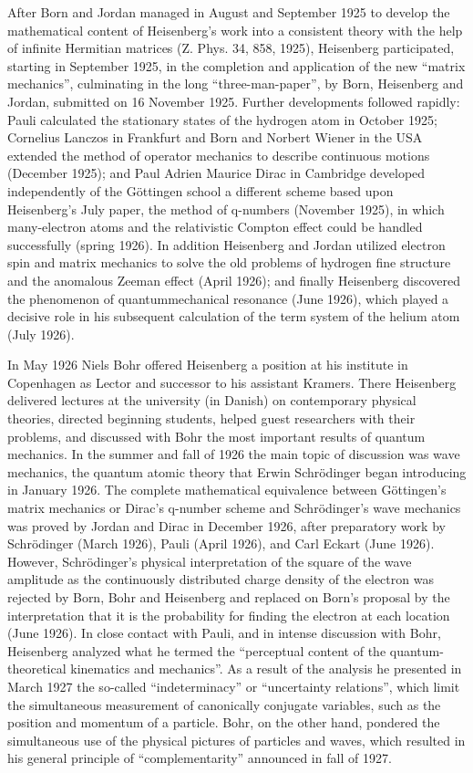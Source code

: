 \documentclass{article}
\begin{document}
After Born and Jordan managed in August and September 1925 to develop the mathematical content of Heisenberg's work into a consistent theory with the help of infinite Hermitian matrices (Z. Phys. 34, 858, 1925), Heisenberg participated, starting in September 1925, in the completion and application of the new “matrix mechanics”, culminating in the long “three-man-paper”, by Born, Heisenberg and Jordan, submitted on 16 November 1925. Further developments followed rapidly: Pauli calculated the stationary states of the hydrogen atom in October 1925; Cornelius Lanczos in Frankfurt and Born and Norbert Wiener in the USA extended the method of operator mechanics to describe continuous motions (December 1925); and Paul Adrien Maurice Dirac in Cambridge developed independently of the Göttingen school a different scheme based upon Heisenberg's July paper, the method of q-numbers (November 1925), in which many-electron atoms and the relativistic Compton effect could be handled successfully (spring 1926). In addition Heisenberg and Jordan utilized electron spin and matrix mechanics to solve the old problems of hydrogen fine structure and the anomalous Zeeman effect (April 1926); and finally Heisenberg discovered the phenomenon of quantummechanical resonance (June 1926), which played a decisive role in his subsequent calculation of the term system of the helium atom (July 1926).

In May 1926 Niels Bohr offered Heisenberg a position at his institute in Copenhagen as Lector and successor to his assistant Kramers. There Heisenberg delivered lectures at the university (in Danish) on contemporary physical theories, directed beginning students, helped guest researchers with their problems, and discussed with Bohr the most important results of quantum mechanics. In the summer and fall of 1926 the main topic of discussion was wave mechanics, the quantum atomic theory that Erwin Schrödinger began introducing in January 1926. The complete mathematical equivalence between Göttingen's matrix mechanics or Dirac's q-number scheme and Schrödinger's wave mechanics was proved by Jordan and Dirac in December 1926, after preparatory work by Schrödinger (March 1926), Pauli (April 1926), and Carl Eckart (June 1926). However, Schrödinger's physical interpretation of the square of the wave amplitude as the continuously distributed charge density of the electron was rejected by Born, Bohr and Heisenberg and replaced on Born's proposal by the interpretation that it is the probability for finding the electron at each location (June 1926). In close contact with Pauli, and in intense discussion with Bohr, Heisenberg analyzed what he termed the “perceptual content of the quantum-theoretical kinematics and mechanics”. As a result of the analysis he presented in March 1927 the so-called “indeterminacy” or “uncertainty relations”, which limit the simultaneous measurement of canonically conjugate variables, such as the position and momentum of a particle. Bohr, on the other hand, pondered the simultaneous use of the physical pictures of particles and waves, which resulted in his general principle of “complementarity” announced in fall of 1927.
\end{document}
